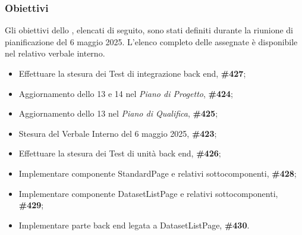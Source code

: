 \subsubsection{Obiettivi}
\label{sec:obiettivi_sprint14}

Gli obiettivi dello , elencati di seguito, sono stati definiti durante la riunione di pianificazione del 6 maggio 2025.
L’elenco completo delle  assegnate è disponibile nel relativo verbale interno.

\begin{itemize}
    \item Effettuare la stesura dei Test di integrazione back end,  \textbf{\#427};
    \item Aggiornamento dello  13 e 14 nel \textit{Piano di Progetto},  \textbf{\#424};
    \item Aggiornamento dello  13 nel \textit{Piano di Qualifica},  \textbf{\#425};
    \item Stesura del Verbale Interno del 6 maggio 2025,  \textbf{\#423};
    \item Effettuare la stesura dei Test di unità back end,  \textbf{\#426};
    \item Implementare componente StandardPage e relativi sottocomponenti,  \textbf{\#428};
    \item Implementare componente DatasetListPage e relativi sottocomponenti,  \textbf{\#429};
    \item Implementare parte back end legata a DatasetListPage,  \textbf{\#430}.
\end{itemize}